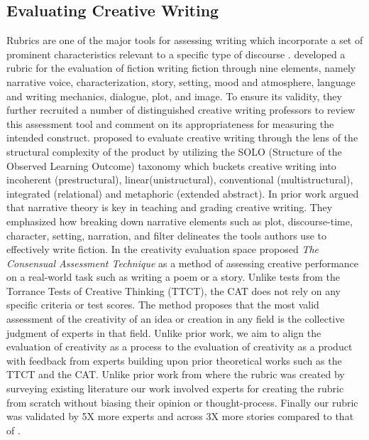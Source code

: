 \subsection{Evaluating Creative Writing}
Rubrics are one of the major tools for assessing writing which incorporate a set of prominent characteristics relevant to a specific type of discourse \cite{weigle2002assessing}. \citet{vaezi2019development} developed a rubric for the evaluation of fiction writing fiction through nine elements, namely narrative voice, characterization, story, setting, mood and atmosphere, language and writing mechanics, dialogue, plot, and image. To ensure its validity, they further recruited a number of distinguished creative writing professors to review this assessment tool and comment on its appropriateness for measuring the intended construct. \citet{biggs1982psychological} proposed to evaluate creative writing through the lens of the structural complexity of the product by utilizing the SOLO (Structure of the Observed Learning Outcome) taxonomy which buckets creative writing into incoherent (prestructural), linear(unistructural), conventional (multistructural), integrated (relational) and metaphoric (extended abstract). In prior work \citet{rodriguez2008problem} argued that narrative theory is key in teaching and grading creative writing. They emphasized how breaking down narrative elements such as plot, discourse-time, character, setting, narration, and filter delineates the tools authors use to effectively write fiction. In the creativity evaluation space \citet{baer2009assessing,amabile1982social} proposed \textit{The Consensual Assessment Technique} as a method of assessing creative performance on a real-world task such as writing a poem or a story. Unlike tests from the Torrance Tests of Creative Thinking (TTCT), the CAT does not rely on any specific criteria or test scores. The method proposes that the most valid assessment of the creativity of an idea or creation in any field is the collective judgment of experts in that field. Unlike prior work, we aim to align the evaluation of creativity as a process to the evaluation of creativity as a product with feedback from experts building upon prior theoretical works such as the TTCT and the CAT. Unlike prior work from \citet{vaezi2019development} where the rubric was created by surveying existing literature our work involved experts for creating the rubric from scratch without biasing their opinion or thought-process. Finally our rubric was validated by 5X more experts and across 3X more stories compared to that of \citet{vaezi2019development}.
